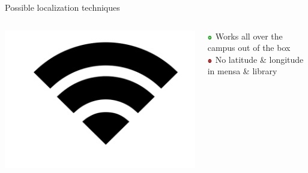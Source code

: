 \documentclass[11pt]{beamer}
\begin{document}
\begin{frame}{Possible localization techniques}

  \begin{columns}[c]

    \begin{column}{0.2\textwidth}
      \includegraphics[width=\textwidth]{wifi-symbol}
    \end{column}

    \hfill

    \begin{column}{0.8\textwidth}

      \includegraphics[width=0.05\textwidth]{plus} Works all over the campus out of the box\\
      \includegraphics[width=0.05\textwidth]{minus} No latitude \& longitude in mensa \& library

    \end{column}

  \end{columns}

  \pause

  \hrulefill

  \begin{columns}[c]


\end{columns}
\end{frame}
\end{document}
